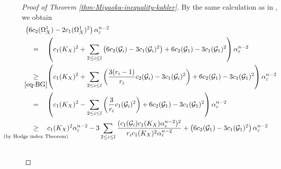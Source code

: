 \documentclass[12pt]{amsart}
\theoremstyle{definition}
\theoremstyle{remark}
\numberwithin{equation}{section}
\newcommand{\underalign}[2]{\quad \underset{\mathclap{\strut #1}}{#2}\quad}
\begin{document}
\begin{proof}[Proof of Theorem \ref{thm-Miyaoka-inequality-kahler}]
By the same calculation as in \cite[Section 6]{IM22}, we obtain 
\begin{align}
\begin{split}
\label{eq-inequality-cptkahler}
&\left(6c_2(\Omega_{X}^{1}) - 2 c_1(\Omega_{X}^{1})^2 \right)\alpha_{ \varepsilon }^{n-2} \\
&\underalign{}{=}
\left(c_1(K_X)^2  + \sum_{2\le i\le l}\left( 6c_2(\mathcal{G}_i )- 3c_1 (\mathcal{G}_i)^2 \right)
+ 6c_2(\mathcal{G}_1) - 3 c_{1}(\mathcal{G}_1)^{2} \right)\alpha_{ \varepsilon }^{n-2} \\
& \underalign{\eqref{eq-BG}}{\ge} 
\left(c_1(K_X)^2  + \sum_{2\le i\le l}\left( \frac{3(r_i -1)}{r_i}c_2(\mathcal{G}_i )- 3c_1 (\mathcal{G}_i)^2 \right)
+ 6c_2(\mathcal{G}_1) - 3 c_{1}(\mathcal{G}_1)^{2} \right)\alpha_{ \varepsilon }^{n-2} \\
&\underalign{}{=}
\left(c_1(K_X)^2  - \sum_{2\le i\le l}\left( \frac{3}{r_i}c_1 (\mathcal{G}_i)^2 \right)
+ 6c_2(\mathcal{G}_1) - 3 c_{1}(\mathcal{G}_1)^{2} \right)\alpha_{ \varepsilon }^{n-2} \\
& \underalign{\left(\text{by Hodge index Theorem}\right)}{\ge} 
c_1(K_X)^2\alpha_{ \varepsilon }^{n-2} - 
3\sum_{2\le i\le l}\frac{(c_1(\mathcal{G}_i)c_1(K_X) \alpha_{ \varepsilon }^{n-2})^2}{r_ic_1(K_X)^2 \alpha_{ \varepsilon }^{n-2}}
+ \left(6c_2(\mathcal{G}_1) - 3 c_{1}(\mathcal{G}_1)^{2}\right) \alpha_{ \varepsilon }^{n-2} \quad \\\
 \end{split}
\end{align}


\end{proof}
\end{document}

